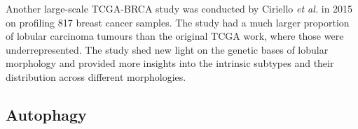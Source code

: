     Another large-scale TCGA-BRCA study was conducted by Ciriello \textit{et al.} in 2015 \cite{Ciriello2015ComprehensiveCancer} on profiling 817 breast cancer samples. The study had a much larger proportion of lobular carcinoma tumours than the original TCGA work, where those were underrepresented. The study shed new light on the genetic bases of lobular morphology and provided more insights into the intrinsic subtypes and their distribution across different morphologies. 
    
    
    
   
    
    
    
    




    
    
    
    
    
    
    
    
    
        
        
        
     \newpage   
    \subsection{Autophagy}
    


